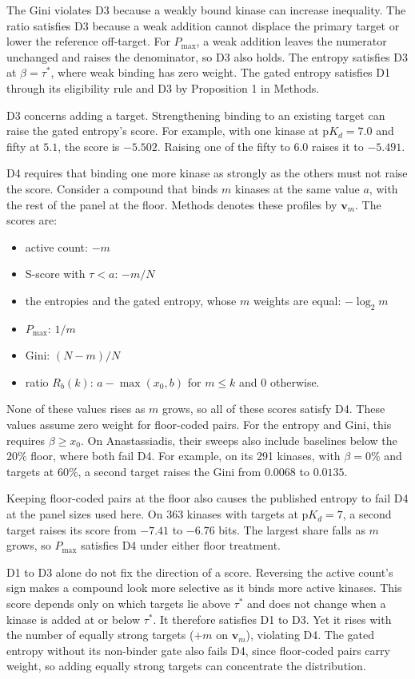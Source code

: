 The Gini violates D3 because a weakly bound kinase can increase inequality.
The ratio satisfies D3 because a weak addition cannot displace the primary
target or lower the reference off-target. For $P_{\max}$, a weak addition
leaves the numerator unchanged and raises the denominator, so D3 also holds.
The entropy satisfies D3 at $\beta = \tau^*$, where weak binding has zero
weight. The gated entropy satisfies D1 through its eligibility rule and D3
by Proposition 1 in Methods.

D3 concerns adding a target. Strengthening binding to an existing target
can raise the gated entropy's score.
For example, with one kinase at $\mathrm{p}K_d = 7.0$ and fifty at $5.1$, the
score is $-5.502$. Raising one of the fifty to $6.0$ raises it to $-5.491$.

D4 requires that binding one more kinase as strongly as the others must not
raise the score. Consider a compound that binds $m$ kinases at the same value
$a$, with the rest of the panel at the floor. Methods denotes these profiles
by $\mathbf{v}_m$. The scores are:
\begin{itemize}
  \item active count: $-m$
  \item S-score with $\tau < a$: $-m/N$
  \item the entropies and the gated entropy, whose $m$ weights are equal:
        $-\log_2 m$
  \item $P_{\max}$: $1/m$
  \item Gini: $(N - m)/N$
  \item ratio $R_b(k)$: $a - \max(x_0, b)$ for $m \leq k$ and $0$ otherwise.
\end{itemize}
None of these values rises as $m$ grows, so all of these scores satisfy D4.
These values assume zero weight for floor-coded pairs. For the entropy and
Gini, this requires $\beta \geq x_0$. On Anastassiadis, their sweeps also
include baselines below the $20\%$ floor, where both fail D4. For example,
on its 291 kinases, with $\beta = 0\%$ and targets at $60\%$, a second target
raises the Gini from $0.0068$ to $0.0135$.

Keeping floor-coded pairs at the floor also causes the published entropy to
fail D4 at the panel sizes used here. On 363 kinases with targets at
$\mathrm{p}K_d = 7$, a second target raises its score from $-7.41$ to
$-6.76$ bits. The largest share falls as $m$ grows, so $P_{\max}$ satisfies
D4 under either floor treatment.

D1 to D3 alone do not fix the direction of a score. Reversing the active
count's sign makes a compound look more selective as it binds more active
kinases. This score depends only on which targets lie above $\tau^*$ and
does not change when a kinase is added at or below $\tau^*$. It therefore
satisfies D1 to D3. Yet it rises with the number
of equally strong targets ($+m$ on $\mathbf{v}_m$), violating D4.
The gated entropy without its non-binder gate also fails D4, since floor-coded
pairs carry weight, so adding equally strong targets can concentrate the
distribution.

